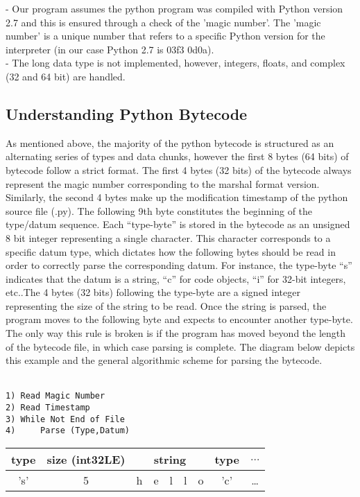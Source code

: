 \documentclass{article}
\begin{document}
- Our program assumes the python program was compiled with Python version 2.7 and this is ensured through a check of the 'magic number'. The 'magic number'  is a unique number that refers to a specific Python version for the interpreter (in our case Python 2.7 is 03f3 0d0a). \\
- The long data type is not implemented, however, integers, floats, and complex (32 and 64 bit) are handled.

\subsection{Understanding Python Bytecode}

As mentioned above, the majority of the python bytecode is structured as an alternating series of types and data chunks, however the first 8 bytes (64 bits) of bytecode follow a strict format.  The first 4 bytes (32 bits) of the bytecode always represent the magic number corresponding to the marshal format version.  Similarly, the second 4 bytes make up the modification timestamp of the python source file (.py).  The following 9th byte constitutes the beginning of the type/datum sequence.  Each ``type-byte'' is stored in the bytecode as an unsigned 8 bit integer representing a single character.  This character corresponds to a specific datum type, which dictates how the following bytes should be read in order to correctly parse the corresponding datum.  For instance, the type-byte ``s'' indicates that the datum is a string, ``c''  for code objects, ``i''  for 32-bit integers, etc..The 4 bytes (32 bits) following the type-byte are a signed integer representing the size of the string to be read.  Once the string is parsed, the program moves to the following byte and expects to encounter another type-byte.  The only way this rule is broken is if the program has moved beyond the length of the bytecode file, in which case parsing is complete.  The diagram below depicts this example and the general algorithmic scheme for parsing the bytecode.\\
\\
\begin{minipage}{\textwidth}
\begin{minipage}{0.35\textwidth}
\begin{verbatim}
1) Read Magic Number
2) Read Timestamp
3) While Not End of File
4)     Parse (Type,Datum)
\end{verbatim}
\end{minipage}
\begin{minipage}{.64\textwidth}
\begin{tabular}{ c | c | c | c | c | c | c | c | c }
type & size (int32LE) & \multicolumn{5}{|c|}{string} & type & $\ldots$ \\ \hline
's' & 5 & h & e & l & l & o & 'c' & \ldots \\ \hline
\end{tabular}
\end{minipage}
\end{minipage}
\end{document}
